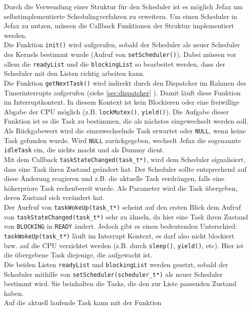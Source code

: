 \documentclass[fontsize=12pt, toc=bibliography, notitlepage]{scrreprt}
\newcommand{\refnn}[1]{\ref{#1} \nameref{#1}}
\begin{document}
Durch die Verwendung einer Struktur für den Scheduler ist es möglich Jefax um selbstimplementierte Schedulingverfahren zu erweitern. Um einen Scheduler in Jefax zu nutzen, müssen die Callback Funktionen der Struktur implementiert werden.\\
Die Funktion \lstinline$init()$ wird aufgerufen, sobald der Scheduler als neuer Scheduler des Kernels bestimmt wurde (Aufruf von \lstinline$setScheduler()$). Dabei müssen vor allem die \lstinline$readyList$ und die \lstinline$blockingList$ so bearbeitet werden, dass der Scheduler mit den Listen richtig arbeiten kann.\\
Die Funktion \lstinline$getNextTask()$ wird indirekt durch den Dispatcher im Rahmen des Timerinterrupts aufgerufen (siehe \refnn{sec:dispatcher}). Damit läuft diese Funktion im Interruptkontext. In diesem Kontext ist kein Blockieren oder eine freiwillige Abgabe der CPU möglich (z.B. \lstinline$lockMutex()$, \lstinline$yield()$). Die Aufgabe dieser Funktion ist es die Task zu bestimmen, die als nächstes eingewechselt werden soll. Als Rückgabewert wird die einzuwechselnde Task erwartet oder \lstinline$NULL$, wenn keine Task gefunden wurde. Wird \lstinline$NULL$ zurückgegeben, wechselt Jefax die sogenannte \lstinline$idleTask$ ein, die nichts macht und als Dummy dient.\\
Mit dem Callback \lstinline$taskStateChanged(task_t*)$, wird dem Scheduler signalisiert, dass eine Task ihren Zustand geändert hat. Der Scheduler sollte entsprechend auf diese Änderung reagieren und z.B. die aktuelle Task verdrängen, falls eine höherpriore Task rechenbereit wurde. Als Parameter wird die Task übergeben, deren Zustand sich verändert hat.\\
Der Aurfruf von \lstinline$taskWokeUp(task_t*)$ scheint auf den ersten Blick dem Aufruf von \lstinline$taskStateChanged(task_t*)$ sehr zu ähneln, da hier eine Task ihren Zustand von \lstinline$BLOCKING$ in \lstinline$READY$ ändert. Jedoch gibt es einen bedeutenden Unterschied: \lstinline$taskWokeUp(task_t*)$ läuft im Interrupt Kontext, es darf also nicht blockiert bzw. auf die CPU verzichtet werden (z.B. durch \lstinline$sleep()$, \lstinline$yield()$, etc). Hier ist die übergebene Task diejenige, die aufgewacht ist.\\
Die beiden Listen \lstinline$readyList$ und \lstinline$blockingList$ werden gesetzt, sobald der Scheduler mithilfe von \lstinline$setScheduler(scheduler_t*)$ als neuer Scheduler bestimmt wird. Sie beinhalten die Tasks, die den zur Liste passenden Zustand haben.\\
Auf die aktuell laufende Task kann mit der Funktion
\end{document}
